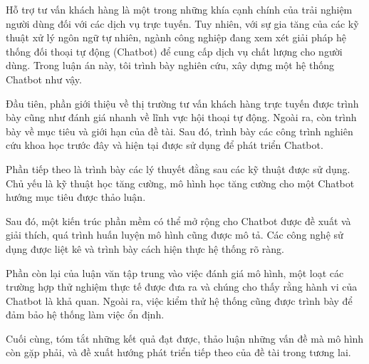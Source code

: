 \documentclass[12pt,a4paper,oneside]{book} %
\begin{document}
\begin{abstractTV}

Hỗ trợ tư vấn khách hàng là một trong những khía cạnh chính của trải nghiệm người dùng đối với các dịch vụ trực tuyến. Tuy nhiên, với sự gia tăng của các kỹ thuật xử lý ngôn ngữ tự nhiên, ngành công nghiệp đang xem xét giải pháp hệ thống đối thoại tự động (Chatbot) để cung cấp dịch vụ chất lượng cho người dùng. Trong luận án này, tôi trình bày nghiên cứu, xây dựng một hệ thống Chatbot như vậy.

Đầu tiên, phần giới thiệu về thị trường tư vấn khách hàng trực tuyến được trình bày cũng như đánh giá nhanh về lĩnh vực hội thoại tự động. Ngoài ra, còn trình bày về mục tiêu và giới hạn của đề tài. Sau đó, trình bày các công trình nghiên cứu khoa học trước đây và hiện tại được sử dụng để phát triển Chatbot.

Phần tiếp theo là trình bày các lý thuyết đằng sau các kỹ thuật được sử dụng. Chủ yếu là kỹ thuật học tăng cường, mô hình học tăng cường cho một Chatbot hướng mục tiêu được thảo luận.

Sau đó, một kiến trúc phần mềm có thể mở rộng cho Chatbot được đề xuất và giải thích, quá trình huấn luyện mô hình cũng được mô tả. Các công nghệ sử dụng được liệt kê và trình bày cách hiện thực hệ thống rõ ràng.

Phần còn lại của luận văn tập trung vào việc đánh giá mô hình, một loạt các trường hợp thử nghiệm thực tế được đưa ra và chúng cho thấy rằng hành vi của Chatbot là khả quan. Ngoài ra, việc kiểm thử hệ thống cũng được trình bày để đảm bảo hệ thống làm việc ổn định.

Cuối cùng, tóm tắt những kết quả đạt được, thảo luận những vấn đề mà mô hình còn gặp phải, và đề xuất hướng phát triển tiếp theo của đề tài trong tương lai.

\end{abstractTV}
\end{document}
